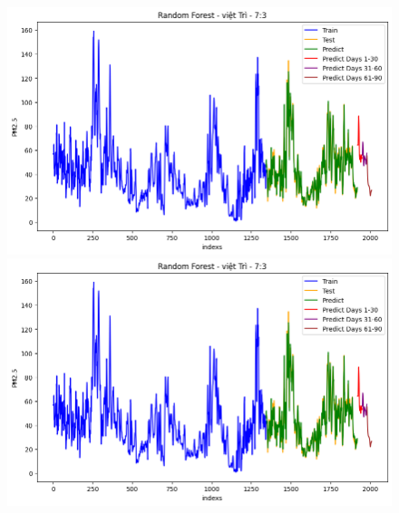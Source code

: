 
\begin{figure}[H]

    \centering
    \begin{minipage}{0.15\textwidth}
    \centering
    \end{minipage}
    \hfill

    \begin{minipage}{0.15\textwidth}
    \centering
    \includegraphics[width=1\textwidth]{img/final/RF/90D/RF_7_3_VT.png}
    \end{minipage}
    \hfill
    \begin{minipage}{0.15\textwidth}
    \centering
    \includegraphics[width=1\textwidth]{img/final/RF/90D/RF_7_3_VT.png}
    \end{minipage}
    \hfill
    \begin{minipage}{0.15\textwidth}
    \centering

\end{minipage}
\end{figure}
